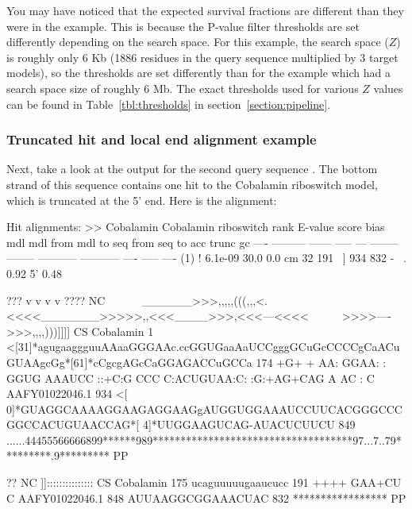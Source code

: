 You may have noticed that the expected survival fractions are
different than they were in the  example. This is
because the P-value filter thresholds are set differently depending on
the search space. For this example, the search space ($Z$) is roughly
only 6 Kb (1886 residues in the query sequence multiplied by 3 target
models), so the thresholds are set differently than for the
 example which had a search space size of roughly 6
Mb. The exact thresholds used for various $Z$ values can be found in
Table~\ref{tbl:thresholds} in section~\ref{section:pipeline}.

\subsubsection{Truncated hit and local end alignment example}
Next, take a look at the  output for the second query
sequence . The bottom strand of this sequence
contains one hit to the Cobalamin riboswitch model, which is truncated
at the 5' end. Here is the alignment:

\begin{widesreoutput}
Hit alignments:
>> Cobalamin  Cobalamin riboswitch
 rank     E-value  score  bias mdl mdl from   mdl to       seq from      seq to       acc trunc   gc
 ----   --------- ------ ----- --- -------- --------    ----------- -----------      ---- ----- ----
  (1) !   6.1e-09   30.0   0.0  cm       32      191 ~]         934         832 - ~. 0.92    5' 0.48

                                 ???              v           v      v    v                                     ???? NC
                     ~~~~~~______>>>,,,,,(((,,,<.<<<<_______>>>>>,,<<<____>>>,<<<---<<<<~~~~~~>>>>---->>>,,,,)))]]]] CS
       Cobalamin   1 <[31]*agugaaggguuAAaaGGGAAc.ccGGUGaaAaUCCgggGCuGcCCCCgCaACuGUAAgcGg*[61]*cCgcgAGcCaGGAGACCuGCCa 174
                             +G+     + AA: GGAA: : GGUG AAAUCC ::+C:G CCC  C:ACUGUAA:C:        :G:+AG+CAG A AC :  C 
  AAFY01022046.1 934 <[ 0]*GUAGGCAAAAGGAAGAGGAAGgAUGGUGGAAAUCCUUCACGGGCCCGGCCACUGUAACCAG*[ 4]*UUGGAAGUCAG-AUACUCUUCU 849
                     ......44455566666899******989************************************97...7..79*********.9********* PP

                     ??                NC
                     ]]::::::::::::::: CS
       Cobalamin 175 ucaguuuuugaaucucc 191
                       ++++   GAA+CU C
  AAFY01022046.1 848 AUUAAGGCGGAAACUAC 832
                     ***************** PP
\end{widesreoutput}

